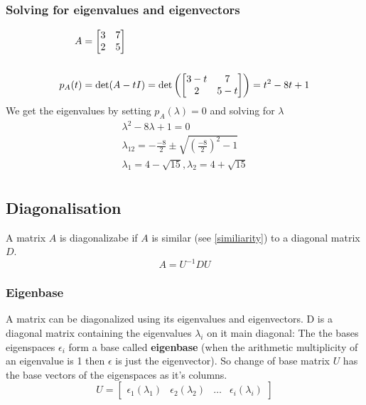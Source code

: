 \subsubsection{Solving for eigenvalues and eigenvectors}
\begin{example}
    \begin{align*}
        A      & = \begin{bmatrix}
            3 & 7 \\ 2 & 5
        \end{bmatrix}                                                 \\                                                                                                                                                  \\
        p_A(t) & = \det(A - t I)  = \det \left( \begin{bmatrix}
                3 - t & 7 \\2  & 5 - t
            \end{bmatrix} \right) =  t^2 - 8 t + 1 \\
    \end{align*}
    We get the eigenvalues by setting \(p_A(\lambda) = 0\) and solving for \( \lambda \)
    \begin{align*}
        \lambda^2 - 8 \lambda + 1 = 0                                           \\
        \lambda_{12} = -\frac{-8}{2} \pm \sqrt{\left( \frac{-8}{2}\right)^2 -1} \\
        \lambda_1 = 4 - \sqrt{15},  \lambda_2 = 4 + \sqrt{15}                   \\
    \end{align*}
\end{example}
\subsection{Diagonalisation}
A matrix $A$ is diagonalizabe if $A$ is similar (see \ref{similiarity}) to a diagonal matrix $D$.
\begin{equation*}
    A = U^{-1}DU
\end{equation*}
\subsubsection{Eigenbase}
A  matrix can be diagonalized using its eigenvalues and eigenvectors.
D is a diagonal matrix containing the eigenvalues $\lambda_i$ on it main diagonal:
The the bases eigenspaces $\epsilon_i$ form a base called \textbf{eigenbase} (when the arithmetic multiplicity of an eigenvalue is 1 then $\epsilon$ is just the eigenvector).
So change of base matrix $U$ has the base vectors of the eigenspaces as it's columns.
\begin{equation}
    U = \begin{bmatrix}
        \epsilon_1(\lambda_1) & \epsilon_2(\lambda_2) & \dots & \epsilon_i(\lambda_i)
    \end{bmatrix}
\end{equation}